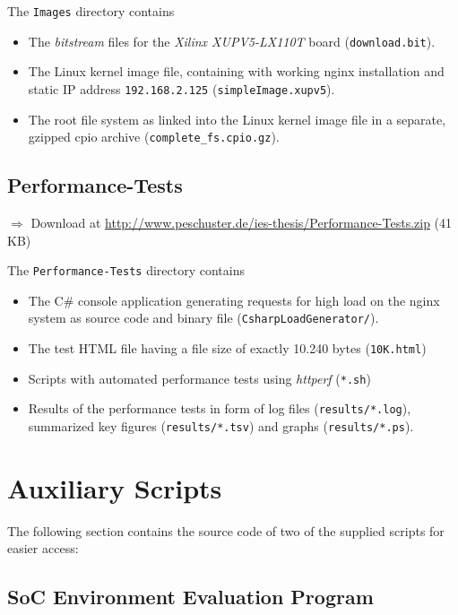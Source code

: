 The \texttt{Images} directory contains 

\begin{itemize}
  \setlength{\itemsep}{1pt}
  \setlength{\parskip}{2pt}
  \setlength{\parsep}{2pt}
\item The \textit{bitstream} files for the \textit{Xilinx XUPV5-LX110T} board (\texttt{download.bit}).
\item The Linux kernel image file, containing with working nginx installation and static IP address \texttt{192.168.2.125} (\texttt{simpleImage.xupv5}).
\item The root file system as linked into the Linux kernel image file in a separate, gzipped cpio archive (\texttt{complete\_fs.cpio.gz}).
\end{itemize}

\subsection{Performance-Tests}
$\Rightarrow$ Download at \url{http://www.peschuster.de/ies-thesis/Performance-Tests.zip} (41 KB)

The \texttt{Performance-Tests} directory contains 

\begin{itemize}
  \setlength{\itemsep}{1pt}
  \setlength{\parskip}{2pt}
  \setlength{\parsep}{2pt}
\item The C\# console application generating requests for high load on the nginx system as source code and binary file (\texttt{CsharpLoadGenerator/}).
\item The test HTML file having a file size of exactly 10.240 bytes (\texttt{10K.html})
\item Scripts with automated performance tests using \textit{httperf} (\texttt{*.sh})
\item Results of the performance tests in form of log files (\texttt{results/*.log}), summarized key figures (\texttt{results/*.tsv}) and graphs (\texttt{results/*.ps}).
\end{itemize}

\section{Auxiliary Scripts}
The following section contains the source code of two of the supplied scripts for easier access:

\subsection{SoC Environment Evaluation Program}
\label{sec:nginx-env-eval}

